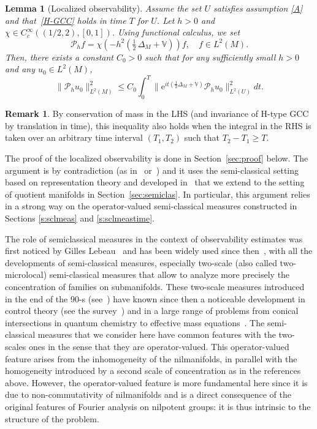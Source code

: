\documentclass[10pt]{amsart}
\let\mathcal\mathscr
\newcommand{\rme}{\mathrm{e}}
\theoremstyle{plain}
\newtheorem{lemma}[theorem]{Lemma}
\theoremstyle{definition}
\newtheorem{remark}[theorem]{Remark}
\def\bbV{{\mathbb V}}
\begin{document}
\begin{lemma}[Localized observability]\label{lem:locobs}
Assume the set $U$ satisfies assumption \eqref{A} and that~\eqref{H-GCC} holds in time $T$ for $U$. Let $h>0$ and $\chi\in C_c^\infty((1/2,2),[0,1])$. Using functional calculus, we set
\begin{equation}\label{def:Pih}
\mathcal{P}_h f= \chi\left(-h^2\left(\tfrac12\, \Delta_M+\bbV\right)\right) f,\quad f\in L^2(M).
\end{equation}
Then, there exists a constant $C_0>0$ such that for any sufficiently small $h>0$ and any $u_0\in L^2(M)$,
\begin{equation}\label{obs_loc}
\| \mathcal{P}_h u_0\|^2_{L^2(M)} \leq C_0 \int_0^T \bigl\| \rme^{it(\frac12 \Delta_M+\bbV)} \mathcal{P}_h u_0\bigr\|^2_{L^2(U)} dt.
\end{equation}
\end{lemma}

\begin{remark} \label{r:masscons}
By conservation of mass in the LHS (and invariance of H-type GCC by translation in time), this inequality also holds when the integral in the RHS is taken over an arbitrary time interval $(T_1,T_2)$ such that $T_2-T_1\geq T$.
\end{remark}

The proof of the localized observability is done in Section~\ref{sec:proof} below.
The argument is by contradiction (as in~\cite{BZ} or~\cite[\S 7]{AM14}) and it
uses the semi-classical setting based on representation theory and developed in~\cite{FF1,FF} that we extend to the setting of quotient manifolds in Section~\ref{sec:semiclas}.
In particular, this argument relies in a strong way on the operator-valued semi-classical measures constructed in Sections \ref{s:sclmeas} and \ref{s:sclmeastime}.

The role of semiclassical measures in the context of observability estimates was first noticed by Gilles Lebeau~\cite{lebeau}
and has been
widely used since then~\cite{MaciaTorus,AM14,AFM15,MacRiv18}, with all the developments of semi-classical measures, especially two-scale (also called two-microlocal) semi-classical measures that allow to analyze more precisely the concentration of families on submanifolds. These two-scale measures introduced in the end of the 90-s (see~\cite{Fermanian_note1,Fermanian_Note2,FG02, NierScat, MillerThesis}) have known since then a noticeable development in control theory (see the survey~\cite{MaciaLille}) and in a large range of problems from conical intersections in quantum chemistry \cite{LT05, FL08} to effective mass equations~\cite{CFM19,CFM20}. The semi-classical measures that we consider here have common features with the two-scales ones in the sense that they are operator-valued. This operator-valued feature arises from the inhomogeneity of the nilmanifolds, in parallel with the homogeneity introduced by a second scale of concentration as in the references above. However, the operator-valued feature is more fundamental here since it is due to non-commutativity of nilmanifolds and is a direct consequence of the original features of Fourier analysis on nilpotent groups: it is thus intrinsic to the structure of the problem.
\end{document}
